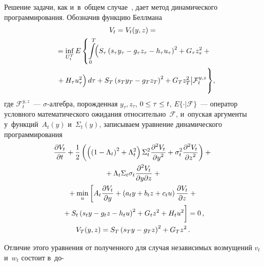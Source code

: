 \begin{multicols}{2}
     Решение задачи, как и~в~общем случае~\cite{1-bos}, дает метод 
динамического программирования. Обозначив функцию Беллмана
     \begin{multline*}
     V_t= V_t(y,z) ={}\\
     {}= \mathop{\mathrm{inf}}\limits_{U_t^T} E \left \{
     \int\limits_0^{{T}} \!\!\left( S_\tau\left( s_\tau y_\tau -g_\tau z_\tau -h_\tau 
u_\tau \right)^2 +G_\tau z_\tau^2 +{}\right.\right.\hspace*{-2.35788pt}\\
\left.\left.{}+H_\tau u_\tau^2
\vphantom{\left( \right)^2}
\right)d\tau +
     S_T\left( s_T y_T -g_T z_T\right)^2 +G_T 
z_T^2\big\vert {\mathcal{F}_t^{y,z}}
\vphantom{\int\limits_0^{{T}}}
\right\}\!, \hspace*{-4.30814pt}
     \end{multline*}
где $\mathcal{F}_t^{y,z}$~--- $\sigma$-ал\-геб\-ра, порожденная $y_\tau, 
z_\tau$, $0\hm\leq \tau \hm\leq t$, $E\{\cdot \vert \mathcal{F}\}$~--- оператор 
условного математического ожидания относительно~$\mathcal{F}$, 
и~опуская аргументы у~функций~$A_t(y)$ и~$\Sigma_t(y)$, записываем 
уравнение динамического программирования
\begin{multline}
\fr{\partial V_t}{\partial t}+\fr{1}{2}\left( \left( \left( 1-\Lambda_t\right)^2 
+\Lambda_t^2\right)\Sigma_t^2\fr{\partial^2 V_t}{\partial y^2} +\sigma_t^2 
\fr{\partial^2 V_t}{\partial z^2}\right) +{}\\
{}+\Lambda_t\Sigma_t \sigma_t\fr{\partial^2 
V_t}{\partial y\partial z}+{}\\
{}+
\min\limits_u \left[ A_t\fr{\partial V_t}{\partial y} +\left( a_t y +b_t z+c_t u\right)
\fr{\partial V_t}{\partial z}+{}\right.\\
\left.{}+S_t\left( s_t y -g_t z-h_t u\right)^2+G_t z^2 +H_t 
u^2
\vphantom{\fr{\partial V_t}{\partial y}}
\right]=0\,,
\\
V_T(y,z)=S_T\left( s_T y-g_T z\right)^2+G_T z^2\,.
\label{e6-bos}
\end{multline}
     
    \noindent
     Отличие этого уравнения от полученного для случая независимых 
возмущений $v_t$ и~$w_t$ состоит в~до-\linebreak\vspace*{-12pt}

\pagebreak


\end{multicols}

